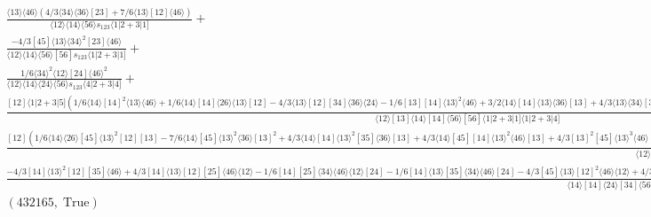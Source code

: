 \documentclass[varwidth, border=5pt]{standalone}
\begin{document}
\begin{my}
$\begin{gathered}
\scriptscriptstyle\frac{⟨13⟩⟨46⟩(4/3⟨34⟩⟨36⟩[23]+7/6⟨13⟩[12]⟨46⟩)}{⟨12⟩⟨14⟩⟨56⟩s_{123}⟨1|2+3|1]}+\\
\scriptscriptstyle\frac{-4/3[45]⟨13⟩⟨34⟩^2[23]⟨46⟩}{⟨12⟩⟨14⟩⟨56⟩[56]s_{123}⟨1|2+3|1]}+\\
\scriptscriptstyle\frac{1/6⟨34⟩^2⟨12⟩[24]⟨46⟩^2}{⟨12⟩⟨14⟩⟨24⟩⟨56⟩s_{123}⟨4|2+3|4]}+\\
\scriptscriptstyle\frac{[12]⟨1|2+3|5](1/6⟨14⟩[14]^2⟨13⟩⟨46⟩+1/6⟨14⟩[14]⟨26⟩⟨13⟩[12]-4/3⟨13⟩[12][34]⟨36⟩⟨24⟩-1/6[13][14]⟨13⟩^2⟨46⟩+3/2⟨14⟩[14]⟨13⟩⟨36⟩[13]+4/3⟨13⟩⟨34⟩[34]⟨36⟩[13]+4/3⟨13⟩[12]⟨23⟩[34]⟨46⟩+4/3[14]⟨34⟩⟨46⟩⟨12⟩[24])}{⟨12⟩[13]⟨14⟩[14]⟨56⟩[56]⟨1|2+3|1]⟨1|2+3|4]}+\\
\scriptscriptstyle\frac{[12](1/6⟨14⟩⟨26⟩[45]⟨13⟩^2[12][13]-7/6⟨14⟩[45]⟨13⟩^2⟨36⟩[13]^2+4/3⟨14⟩[14]⟨13⟩^2[35]⟨36⟩[13]+4/3⟨14⟩[45][14]⟨13⟩^2⟨46⟩[13]+4/3[13]^2[45]⟨13⟩^3⟨46⟩-4/3[14]⟨13⟩^3[35]⟨46⟩[13]+4/3[45][12]⟨34⟩⟨46⟩⟨12⟩^2[24]+4/3[12][35]⟨34⟩⟨36⟩⟨12⟩^2[24]-4/3[45][12]⟨34⟩⟨36⟩[23]⟨12⟩^2-4/3⟨13⟩^2[12]⟨23⟩[35][34]⟨46⟩+4/3⟨13⟩^2[12][35][34]⟨36⟩⟨24⟩)}{⟨12⟩[13]⟨14⟩[14]⟨56⟩[56]⟨1|2+3|1]⟨1|2+3|4]}+\\
\scriptscriptstyle\frac{-4/3[14]⟨13⟩^2[12][35]⟨46⟩+4/3[14]⟨13⟩[12][25]⟨46⟩⟨12⟩-1/6[14][25]⟨34⟩⟨46⟩⟨12⟩[24]-1/6[14]⟨13⟩[35]⟨34⟩⟨46⟩[24]-4/3[45]⟨13⟩[12]^2⟨46⟩⟨12⟩+4/3[45]⟨13⟩^2[12]⟨46⟩[13]-1/6⟨14⟩[14][45]⟨34⟩⟨46⟩[24]-8/3⟨14⟩[45]⟨13⟩[12]⟨36⟩[13]-4/3[45][12]⟨34⟩⟨36⟩[23]⟨12⟩+8/3⟨14⟩[14]⟨13⟩[12][35]⟨36⟩}{⟨14⟩[14]⟨24⟩[34]⟨56⟩[56]⟨1|2+3|4]}+\\
\scriptscriptstyle(432165,\;\text{True})\phantom{+}
\end{gathered}$
\end{my}
\end{document}
